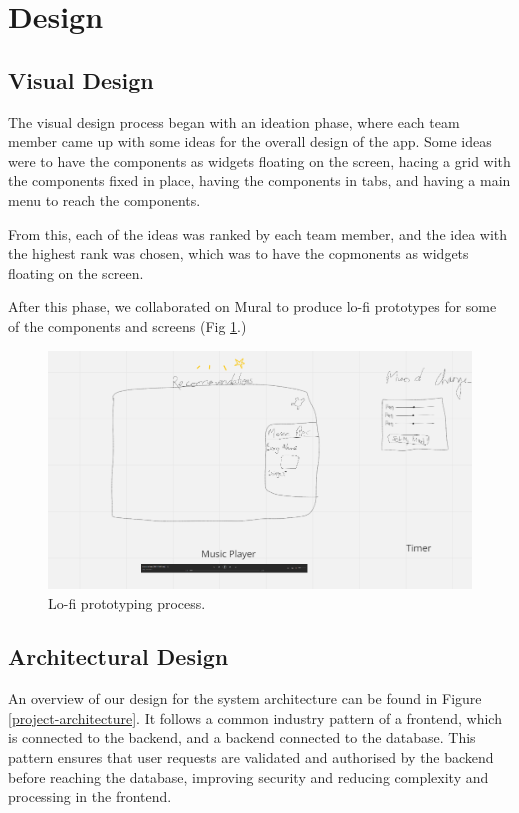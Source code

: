 \documentclass[conference]{IEEEtran}
\begin{document}
\section{Design}
\subsection{Visual Design}
The visual design process began with an ideation phase, where each team member came up with some ideas for the overall design of the app. Some ideas were to have the components as widgets floating on the screen, hacing a grid with the components fixed in place, having the components in tabs, and having a main menu to reach the components. 

From this, each of the ideas was ranked by each team member, and the idea with the highest rank was chosen, which was to have the copmonents as widgets floating on the screen.

After this phase, we collaborated on Mural to produce lo-fi prototypes for some of the components and screens (Fig \ref{prototyping}.)

\begin{figure}[htbp]
\centerline{\includegraphics[width = \linewidth]{prototyping.png}}
\caption{Lo-fi prototyping process.}
\label{prototyping}
\end{figure}

\subsection{Architectural Design}
An overview of our design for the system architecture can be found in Figure \ref{project-architecture}. It follows a common industry pattern of a frontend, which is connected to the backend, and a backend connected to the database. This pattern ensures that user requests are validated and authorised by the backend before reaching the database, improving security and reducing complexity and processing in the frontend.
\end{document}
